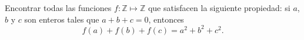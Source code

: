 Encontrar todas las funciones $f:\mathbb{Z}\mapsto \mathbb{Z}$ que satisfacen la siguiente propiedad: si $a$, $b$ y $c$ son enteros tales que $a+b+c=0$, entonces
\[ f(a)+f(b)+f(c)=a^2+b^2+c^2. \]
